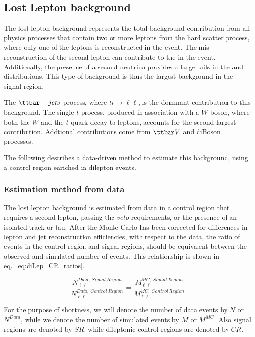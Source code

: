 \subsection{Lost Lepton background}
\label{sec:bkgLL}

The lost lepton background represents the total background contribution from all physics processes that contain two or more leptons from the hard scatter process, where only one of the leptons is reconstructed in the event.  The mis-reconstruction of the second lepton can contribute to the \MET in the event. Additionally, the presence of a second neutrino provides a large tails in the \MT and \MTtW distributions.  This type of background is thus the largest background in the signal region.  

The $\ttjets$ process, where $t\bar{t}\rightarrow\ell\ell$, is the dominant contribution to this background.  The single $t$ process, produced in association with a $W$ boson, where both the $W$ and the $t$-quark decay to leptons, accounts for the second-largest contribution.  Addtional contributions come from ${\ttbar}V$ and diBoson processes.  

The following describes a data-driven method to estimate this background, using a control region enriched in dilepton events.  


\subsubsection{Estimation method from data}
\label{sec:bkgLL:Data}

The lost lepton background is estimated from data in a control region that requires a second lepton, passing the \textit{veto} requirements, or the presence of an isolated track or tau. After the Monte Carlo has been corrected for differences in lepton and jet reconstruction efficiencies, with respect to the data, the ratio of events in the control region and signal regions, should be equivalent between the observed and simulated number of events.  This relationship is shown in eq.~\ref{eq:diLep_CR_ratios}.

\begin{equation}\label{eq:diLep_CR_ratios}
\frac{N^{Data,~Signal~Region}_{\ell\ell}}{N^{Data,~Control~Region}_{\ell\ell}} = 
\frac{M^{MC,~Signal~Region}_{\ell\ell}}{M^{MC,~Control~Region}_{\ell\ell}}
\end{equation}

For the purpose of shortness, we will denote the number of data events by $N$ or $N^{Data}$, while we denote the number of simulated events by $M$ or $M^{MC}$. Also signal regions are denoted by $SR$, while dileptonic control regions are denoted by $CR$.

